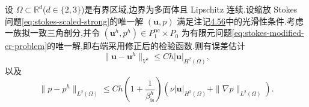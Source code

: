 \begin{theorem}\label{thm:stokes-pressure-robust-error}
设 $\Omega\subset\mathbb{R}^d$($d\in\{2,3\}$)是有界区域,边界为多面体且 Lipschitz 连续.设缩放 Stokes 问题\cref{eq:stokes-scaled-strong}的唯一解 $(\bm{u},p)$ 满足注记\hyperref[note:stokes-nonconforming-consistency-smoothness]{4.56}中的光滑性条件.考虑一族拟一致三角剖分,并令 $(\bm{u}^h,p^h)\in P_1^{\mathrm{nc}}\times P_0$ 为有限元问题\cref{eq:stokes-modified-cr-problem}的唯一解,即右端采用修正后的检验函数.则有误差估计
\begin{equation}\label{eq:stokes-pressure-robust-velocity-error}
  \|\bm{u}-\bm{u}^h\|_{V^h}
  \leq Ch|\bm{u}|_{H^2(\Omega)},
\end{equation}
以及
\begin{equation}\label{eq:stokes-pressure-robust-pressure-error}
  \|p-p^h\|_{L^2(\Omega)}
  \leq Ch\left(1+\frac{1}{\beta_{\mathrm{is}}^h}\right)
      \left(\nu|\bm{u}|_{H^2(\Omega)}
            +\|\nabla p\|_{L^2(\Omega)}\right).
\end{equation}
\end{theorem}
